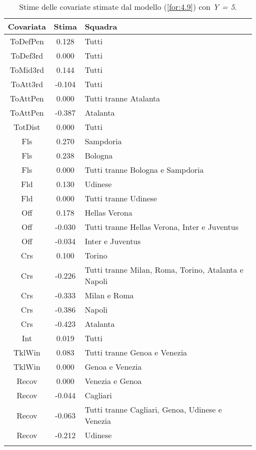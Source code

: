 \begin{table}[!htbp]%
	
	\renewcommand{\arraystretch}{1.7}
	\centering
	\begin{tabular}{ccp{10cm}}
		\hline		
		\rowcolor{SchoolColor2}	
		\textbf{Covariata} & \textbf{Stima} & \textbf{Squadra} \\	
		\hline
		ToDefPen & 0.128 & Tutti \\      
		ToDef3rd & 0.000 & Tutti \\
		ToMid3rd & 0.144 &Tutti\\
		ToAtt3rd & -0.104 & Tutti \\  
		ToAttPen & 0.000 & Tutti tranne Atalanta \\    
		ToAttPen & -0.387 & Atalanta \\ 	     	 
		TotDist & 0.000 & Tutti \\	
		Fls & 0.270 & Sampdoria  \\ 	
		Fls & 0.238 & Bologna  \\
		Fls & 0.000 & Tutti tranne Bologna e Sampdoria  \\
		Fld & 0.130 & Udinese  \\
		Fld & 0.000 & Tutti tranne Udinese \\
		Off & 0.178 & Hellas Verona\\
		Off & -0.030 & Tutti tranne Hellas Verona, Inter e Juventus\\
		Off & -0.034 & Inter e Juventus  \\
		Crs & 0.100 & Torino\\
		Crs & -0.226 & Tutti tranne Milan, Roma, Torino, Atalanta e Napoli\\
		Crs & -0.333 & Milan e Roma\\
		Crs & -0.386 & Napoli\\
		Crs & -0.423 & Atalanta\\
		Int & 0.019 & Tutti\\
		TklWin &  0.083 & Tutti tranne Genoa e Venezia \\ 
		TklWin &  0.000 & Genoa e Venezia \\ 
		Recov &  0.000 & Venezia e Genoa \\ 
		Recov &  -0.044 & Cagliari \\
		Recov &  -0.063 & Tutti tranne Cagliari, Genoa, Udinese e Venezia \\ 
		Recov &  -0.212 & Udinese \\ 
		\hline
		& &  \\
		
	\end{tabular} \hbox{}
	\caption{Stime delle covariate stimate dal modello (\ref{for:4.9}) con \emph{Y = 5}.} \label{tab:BTCL35} 
\end{table}
